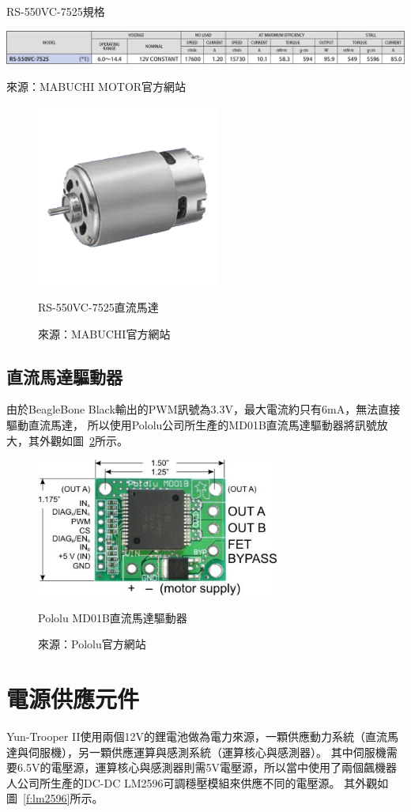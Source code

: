 \begin{table}[h!]
	\centering
	\caption{RS-550VC-7525規格}
	\label{t:rs550vc-specs}
	\includegraphics[width=\textwidth]{tables/RS550VC-specs}
	\caption*{來源：MABUCHI MOTOR官方網站}
\end{table}

\begin{figure}[h!]
	\centering
	\includegraphics[width=6cm]{figures/motor}
	\caption{RS-550VC-7525直流馬達}
	\caption*{來源：MABUCHI官方網站}
	\label{f:rs550vc}
\end{figure}

\subsection{直流馬達驅動器}
由於BeagleBone Black輸出的PWM訊號為3.3V，最大電流約只有6mA，無法直接驅動直流馬達，
所以使用Pololu公司所生產的MD01B直流馬達驅動器將訊號放大，其外觀如圖~\ref{f:motor_driver}所示。

\begin{figure}[h!]
	\centering
	\includegraphics[width=8cm]{figures/motor_driver}
	\caption{Pololu MD01B直流馬達驅動器}
	\caption*{來源：Pololu官方網站}
	\label{f:motor_driver}
\end{figure}

\section{電源供應元件}
Yun-Trooper II使用兩個12V的鋰電池做為電力來源，一顆供應動力系統（直流馬達與伺服機），另一顆供應運算與感測系統（運算核心與感測器）。
其中伺服機需要6.5V的電壓源，運算核心與感測器則需5V電壓源，所以當中使用了兩個飆機器人公司所生產的DC-DC LM2596可調穩壓模組來供應不同的電壓源。
其外觀如圖~\ref{f:lm2596}所示。

